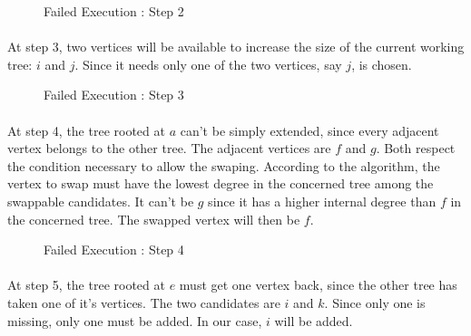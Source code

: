 \begin{figure}[H]
  \caption{Failed Execution : Step 2}
  \begin{center}
    \begin{tikzpicture}[scale=0.9,transform shape]
      
    \end{tikzpicture}
  \end{center}
\end{figure}

\paragraph{}
At step 3, two vertices will be available to increase the size of the current
working tree: $i$ and $j$. Since it needs only one of the two vertices, say
$j$,  is chosen.

\begin{figure}[H]
  \caption{Failed Execution : Step 3}
  \begin{center}
    \begin{tikzpicture}[scale=0.9,transform shape]
      
    \end{tikzpicture}
  \end{center}
\end{figure}

\paragraph{}
At step 4, the tree rooted at $a$ can't be simply extended, since every
adjacent vertex belongs to the other tree. The adjacent vertices are $f$ and
$g$. Both respect the condition necessary to allow the swaping. According to
the algorithm, the vertex to swap must have the lowest degree in the concerned
tree among the swappable candidates. It can't be $g$ since it has a higher
internal degree than $f$ in the concerned tree. The swapped vertex will then be
$f$.

\begin{figure}[H]
  \caption{Failed Execution : Step 4}
  \begin{center}
    \begin{tikzpicture}[scale=0.9,transform shape]
      
    \end{tikzpicture}
  \end{center}
\end{figure}

\paragraph{}
At step 5, the tree rooted at $e$ must get one vertex back, since the other
tree has taken one of it's vertices. The two candidates are $i$ and $k$. Since
only one is missing, only one must be added. In our case, $i$ will be added.

